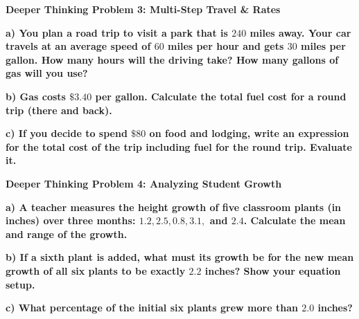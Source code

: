 \documentclass[12pt, letterpaper, fleqn]{article}
\begin{document}
\begin{tcolorbox}[colback=black!5, colframe=black!50, boxrule=1pt, arc=4mm, left=6mm, right=6mm, top=5mm, bottom=5mm]
\textbf{Deeper Thinking Problem 3: Multi-Step Travel \& Rates}

\medskip

\noindent
\textbf{a) You plan a road trip to visit a park that is $240$ miles away. Your car travels at an average speed of $60$ miles per hour and gets $30$ miles per gallon. How many hours will the driving take? How many gallons of gas will you use?}

\vspace{3cm}

\noindent
\textbf{b) Gas costs $\$3.40$ per gallon. Calculate the total fuel cost for a round trip (there and back).}

\vspace{3cm}

\noindent
\textbf{c) If you decide to spend $\$80$ on food and lodging, write an expression for the total cost of the trip including fuel for the round trip. Evaluate it.}

\vspace{2.5cm}
\end{tcolorbox}
\newpage

\begin{tcolorbox}[colback=black!5, colframe=black!50, boxrule=1pt, arc=4mm, left=6mm, right=6mm, top=5mm, bottom=5mm]
\textbf{Deeper Thinking Problem 4: Analyzing Student Growth}

\medskip

\noindent
\textbf{a) A teacher measures the height growth of five classroom plants (in inches) over three months: $1.2, 2.5, 0.8, 3.1,$ and $2.4$. Calculate the mean and range of the growth.}

\vspace{3cm}

\noindent
\textbf{b) If a sixth plant is added, what must its growth be for the new mean growth of all six plants to be exactly $2.2$ inches? Show your equation setup.}

\vspace{3.0cm}

\noindent
\textbf{c) What percentage of the initial six plants grew more than $2.0$ inches?}

\vspace{2.5cm}
\end{tcolorbox}
\end{document}
